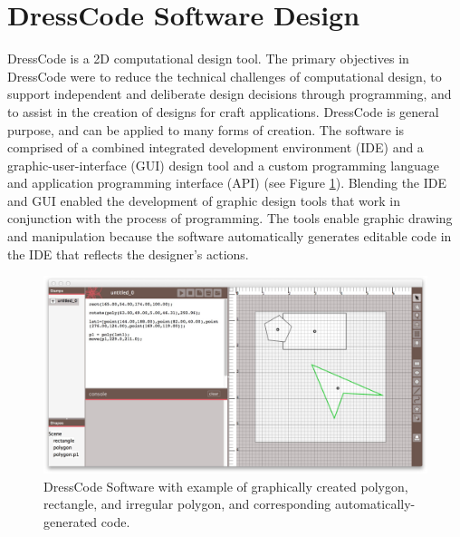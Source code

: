 \documentclass{sigchi}
\begin{document}
\section{DressCode Software Design}
DressCode is a 2D computational design tool. The primary objectives in DressCode were to reduce the technical challenges of computational design, to support independent and deliberate design decisions through programming, and to assist in the creation of designs for craft applications. DressCode is general purpose, and can be applied to many forms of creation. The software is comprised of a combined integrated development environment (IDE) and a graphic-user-interface (GUI) design tool and a custom programming language and application programming interface (API) (see Figure \ref{fig:auto_generated_code}). Blending the IDE and GUI enabled the development of graphic design tools that work in conjunction with the process of programming. The tools enable graphic drawing and manipulation because the software automatically generates editable code in the IDE that reflects the designer's actions.
\begin{center}
\begin{figure}[h!]
\includegraphics[width=\columnwidth]{images/auto_generated_code.jpg}
\caption{DressCode Software with example of graphically created polygon, rectangle, and irregular polygon, and corresponding automatically-generated code.}
\label{fig:auto_generated_code}
\end{figure}
\end{center}
\vspace{-20pt}
\end{document}
